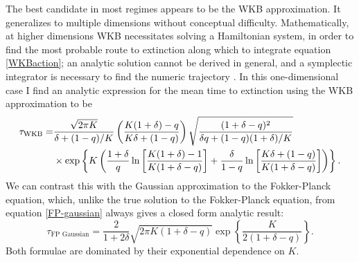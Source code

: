 The best candidate in most regimes appears to be the WKB approximation. 
It generalizes to multiple dimensions without conceptual difficulty.
Mathematically, at higher dimensions WKB necessitates solving a Hamiltonian system, in order to find the most probable route to extinction along which to integrate equation \ref{WKBaction}; an analytic solution cannot be derived in general, and a symplectic integrator is necessary to find the numeric trajectory \cite{Channell1990}. 
In this one-dimensional case I find an analytic expression for the mean time to extinction using the WKB approximation to be
\begin{align}
\tau_{\text{WKB}} = &\frac{\sqrt{2 \pi K}}{\delta+(1-q)/K} \left(\frac{K(1+\delta)-q}{K\delta + (1-q)}\right) \sqrt{\frac{(1+\delta-q)^2}{\delta q + (1-q)(1+\delta)/K}} \\
&\times \exp \left\{ K\left( \frac{1+\delta}{q}\ln\left[\frac{K(1+\delta)-1}{K(1+\delta-q)}\right] + \frac{\delta}{1-q}\ln\left[\frac{K\delta+(1-q)}{K(1+\delta-q)}\right] \right) \right\}. \notag
\end{align}
We can contrast this with the Gaussian approximation to the Fokker-Planck equation, which, unlike the true solution to the Fokker-Planck equation, from equation \ref{FP-gaussian} always gives a closed form analytic result:
\begin{equation}
\tau_{\text{FP Gaussian}} = \frac{2}{1+2\delta} \sqrt{2 \pi K (1+\delta-q)} \exp\left\{\frac{K}{2(1+\delta-q)} \right\}.
 \label{tau-fp-gauss}
\end{equation}
Both formulae are dominated by their exponential dependence on $K$. 
